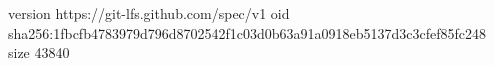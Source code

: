 version https://git-lfs.github.com/spec/v1
oid sha256:1fbcfb4783979d796d8702542f1c03d0b63a91a0918eb5137d3c3cfef85fc248
size 43840
